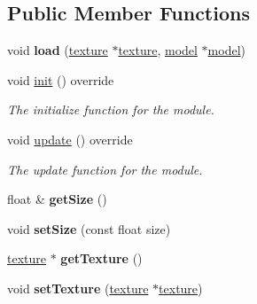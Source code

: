 \subsection*{Public Member Functions}
\begin{DoxyCompactItemize}
\item 
\mbox{\label{classflounder_1_1skybox_ab76e6523423f67b73e804dc06464d8bc}} 
void {\bfseries load} (\hyperlink{classflounder_1_1texture}{texture} $\ast$\hyperlink{classflounder_1_1texture}{texture}, \hyperlink{classflounder_1_1model}{model} $\ast$\hyperlink{classflounder_1_1model}{model})
\item 
void \hyperlink{classflounder_1_1skybox_ad298f30a9e35657726bc8043a687cab7}{init} () override
\begin{DoxyCompactList}\small\item\em The initialize function for the module. \end{DoxyCompactList}\item 
void \hyperlink{classflounder_1_1skybox_a9c961cf6d878f40f0294905415981234}{update} () override
\begin{DoxyCompactList}\small\item\em The update function for the module. \end{DoxyCompactList}\item 
\mbox{\label{classflounder_1_1skybox_a0d78d655d39bec325636c5672d744f5f}} 
float \& {\bfseries get\+Size} ()
\item 
\mbox{\label{classflounder_1_1skybox_ad9483d0e97e54f5497c60b7350f9d888}} 
void {\bfseries set\+Size} (const float size)
\item 
\mbox{\label{classflounder_1_1skybox_a20c6e39b06419ed1e8614f70044aff04}} 
\hyperlink{classflounder_1_1texture}{texture} $\ast$ {\bfseries get\+Texture} ()
\item 
\mbox{\label{classflounder_1_1skybox_a52535c9e9cc91303301be8337f5d56b3}} 
void {\bfseries set\+Texture} (\hyperlink{classflounder_1_1texture}{texture} $\ast$\hyperlink{classflounder_1_1texture}{texture})
\item 
\mbox{\label{classflounder_1_1skybox_a451efb79710eec0ce2f14bec9cc85111}} 

\end{DoxyCompactItemize}
